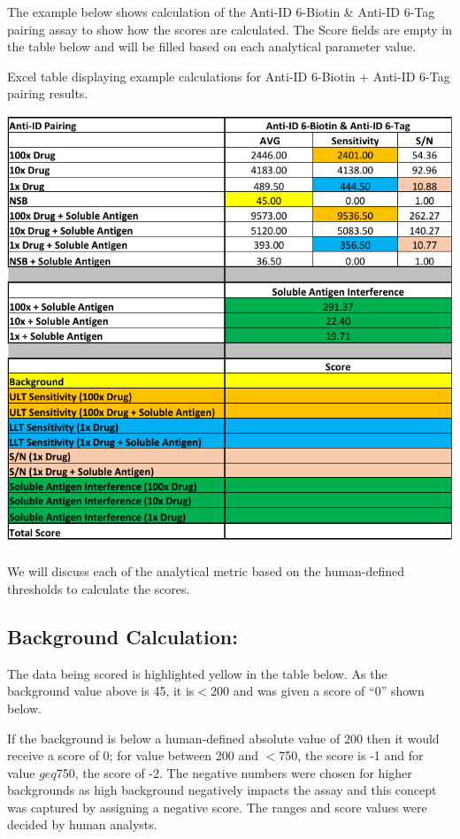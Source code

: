 The example below shows calculation of the Anti-ID 6-Biotin & Anti-ID 6-Tag pairing assay to show how the scores are calculated. The Score fields are empty in the table below and will be filled based on each analytical parameter value.

\begin{table}[ht]
 \centering
 \caption{Excel table displaying example calculations for Anti-ID 6-Biotin + Anti-ID 6-Tag pairing results.}
 \includegraphics{graphics/ch3/Table_2.pdf}
\end{table} 

We will discuss each of the analytical metric based on the human-defined thresholds to calculate the scores.
\subsection*{Background Calculation:}
The data being scored is highlighted yellow in the table below.  As the background value above is 45, it is$ <$200 and was given a score of “0” shown below.

If the background is below a human-defined absolute value of 200 then it would receive a score of 0; for value between 200 and $<$750, the score is -1 and for value $geq$750, the score of -2.  The negative numbers were chosen for higher backgrounds as high background negatively impacts the assay and this concept was captured by assigning a negative score.  The ranges and score values were decided by human analysts.

